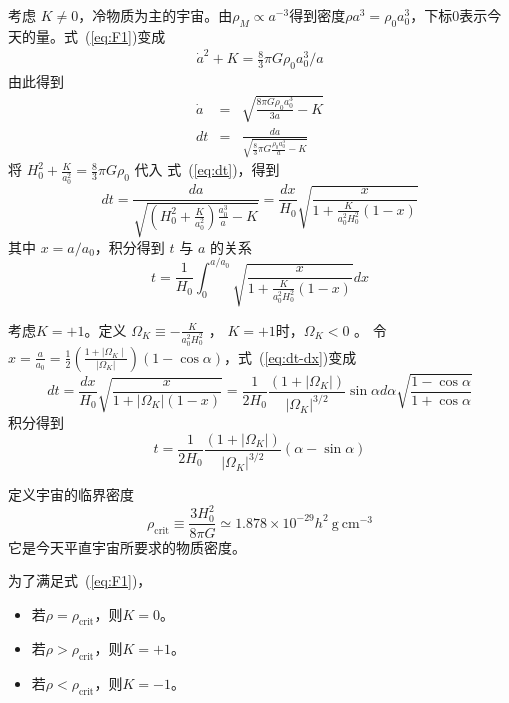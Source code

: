 \documentclass[12pt]{ctexart}
\newcommand{\refeq}[1]{式~(\ref{#1})}
\begin{document}
考虑 $K\neq 0$，冷物质为主的宇宙。由$\rho_M\propto a^{-3}$得到密度$\rho a^3 = \rho_0 a^3_0$，下标0表示今天的量。\refeq{eq:F1}变成
\begin{eqnarray}
    \dot{a}^2 + K = \frac{8}{3} \pi G \rho_0 a_0^3/a 
\end{eqnarray} 
由此得到
\begin{eqnarray}
    \dot{a}&=&\sqrt{\frac{8 \pi G \rho_{0} a_{0}^{3}}{3 a}-K} \\
    d t&=&\frac{d a}{\sqrt{\frac{8}{3} \pi G \frac{\rho_{0} a_{0}^{3}}{a}-K}} \label{eq:dt}
\end{eqnarray}
将 $H_0^2+\frac{K}{a_0^2}=\frac{8}{3}\pi G \rho_0$  代入 \refeq{eq:dt}，得到
\begin{equation}
    d t=\frac{d a}{\sqrt{\left(H_{0}^{2}+\frac{K}{a_{0}^{2}}\right) \frac{a_{0}^{3}}{a}-K}}=\frac{d x}{H_{0}} \sqrt{\frac{x}{1+\frac{K}{a_{0}^{2} H_{0}^{2}}(1-x)}} \label{eq:dt-dx}
\end{equation}
其中 $x=a/a_0$，积分得到 $t$ 与 $a$ 的关系 
\begin{equation}
    t=\frac{1}{H_{0}} \int_{0}^{a/a_{0}} \sqrt{\frac{x}{1+\frac{K}{a_{0}^{2} H_{0}^{2}}(1-x)}} d x
\end{equation}

考虑$K=+1$。定义 $\Omega_K \equiv -\frac{K}{a_0^2 H_0^2}$ ， $K=+1$时，$\Omega_K <0$ 。
令 $x=\frac{a}{a_{0}}=\frac{1}{2}\left(\frac{1+| \Omega_{K} \mid}{\left|\Omega_{K}\right|}\right)(1-\cos \alpha)$，\refeq{eq:dt-dx}变成
\begin{equation}
    d t=\frac{d x}{H_{0}} \sqrt{\frac{x}{1+\left|\Omega_{K}\right|(1-x)}}=\frac{1}{2 H_{0}} \frac{\left(1+\left|\Omega_{K}\right|\right)}{\left|\Omega_{K}\right|^{3 / 2}} \sin \alpha d \alpha \sqrt{\frac{1-\cos \alpha}{1+ \cos  \alpha}}
\end{equation}
积分得到
\begin{equation}
    t=\frac{1}{2 H_{0}} \frac{\left(1+\left|\Omega_{K}\right|\right)}{\left|\Omega_{K}\right|^{3 / 2}}(\alpha-\sin \alpha)
\end{equation}

定义宇宙的临界密度
\begin{equation}
    \rho_\text{crit} \equiv \frac{3H_0^2}{8\pi G} \simeq 1.878\times 10^{-29} h^2 \mathrm{~g~cm^{-3}}
\end{equation}
它是今天平直宇宙所要求的物质密度。


为了满足\refeq{eq:F1}，
\begin{itemize}
    \item 若$\rho=\rho_\text{crit}$，则$K=0$。
    \item 若$\rho>\rho_\text{crit}$，则$K=+1$。
    \item 若$\rho<\rho_\text{crit}$，则$K=-1$。
\end{itemize}
\end{document}
